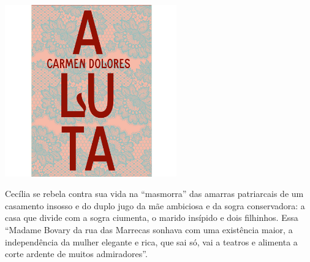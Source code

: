 \vfill

\hspace*{-.4cm}\begin{minipage}[c]{.5\linewidth}
\small{
{}}
\end{minipage}

\pagebreak %


\begin{center}
\hspace*{-3.6cm}
\hspace*{3.1cm}\includegraphics[width=74mm]{./grid/luta.jpg}
\end{center}

\hspace*{-7cm}\hrulefill\hspace*{-7cm}

\medskip

\noindent{}Cecília se rebela contra sua vida na “masmorra” das amarras patriarcais de um casamento insosso e do duplo jugo da mãe ambiciosa e da sogra conservadora: a casa que divide com a sogra ciumenta, o marido insípido e dois filhinhos. Essa “Madame Bovary da rua das Marrecas sonhava com uma existência maior, a independência da mulher elegante e rica, que sai só, vai a teatros e alimenta a corte ardente de muitos admiradores”.

